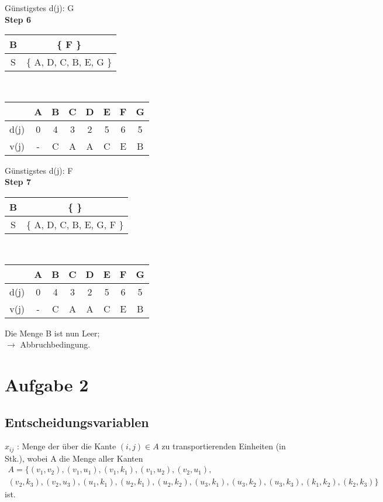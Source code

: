 \documentclass[a4paper,11pt]{article}
\begin{document}
{\begin{multicols}{2}
Günstigstes d(j): G \\

\textbf{Step 6} \\
\begin{tabular}{ |c|c| } 
  \hline
  B & \{ F \} \\
  \hline
  S & \{ A, D, C, B, E, G \} \\ 
  \hline
 \end{tabular} \\
\begin{tabular}{ |c|c|c|c|c|c|c|c| } 
  \hline
       & A & B & C & D & E & F & G \\
  \hline
  d(j) & 0 & 4 & 3 & 2 & 5 & 6 & 5 \\
  \hline
  v(j) & - & C & A & A & C & E & B \\
  \hline
\end{tabular}
\vspace{4mm}

Günstigstes d(j): F \\

\textbf{Step 7} \\
\begin{tabular}{ |c|c| } 
  \hline
  B & \{ \} \\
  \hline
  S & \{ A, D, C, B, E, G, F \} \\ 
  \hline
 \end{tabular} \\
\begin{tabular}{ |c|c|c|c|c|c|c|c| } 
  \hline
       & A & B & C & D & E & F & G \\
  \hline
  d(j) & 0 & 4 & 3 & 2 & 5 & 6 & 5 \\
  \hline
  v(j) & - & C & A & A & C & E & B \\
  \hline
\end{tabular}
\vspace{4mm}

Die Menge B ist nun Leer; \\
$\to$ Abbruchbedingung.

\end{multicols}}
\vspace{10mm}


\section*{Aufgabe 2}

\subsection*{Entscheidungsvariablen}
$x_{i j}$ : Menge der über die Kante $(i,j) \in A$ zu transportierenden Einheiten (in Stk.), wobei A die Menge aller Kanten
\begin{multline*}
A = \{(v_1, v_2),(v_1, u_1),(v_1, k_1),(v_1, u_2),(v_2, u_1),\\
(v_2, k_3),(v_2, u_3),(u_1, k_1),(u_2, k_1),(u_2, k_2),(u_3, k_1),(u_3, k_2),(u_3, k_3),(k_1, k_2),(k_2, k_3)\}
\end{multline*}
ist. \\
\end{document}

